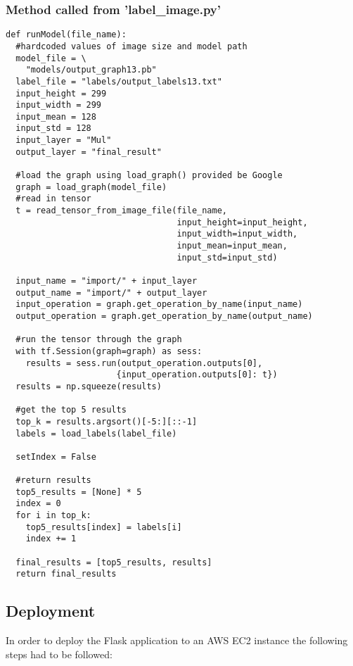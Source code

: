 \subsubsection*{Method called from 'label\_image.py'}
\begin{lstlisting}[style=Python]
def runModel(file_name):
  #hardcoded values of image size and model path
  model_file = \
    "models/output_graph13.pb"
  label_file = "labels/output_labels13.txt"
  input_height = 299
  input_width = 299
  input_mean = 128
  input_std = 128
  input_layer = "Mul"
  output_layer = "final_result"

  #load the graph using load_graph() provided be Google
  graph = load_graph(model_file)
  #read in tensor
  t = read_tensor_from_image_file(file_name,
                                  input_height=input_height,
                                  input_width=input_width,
                                  input_mean=input_mean,
                                  input_std=input_std)

  input_name = "import/" + input_layer
  output_name = "import/" + output_layer
  input_operation = graph.get_operation_by_name(input_name)
  output_operation = graph.get_operation_by_name(output_name)

  #run the tensor through the graph
  with tf.Session(graph=graph) as sess:
    results = sess.run(output_operation.outputs[0],
                      {input_operation.outputs[0]: t})
  results = np.squeeze(results)

  #get the top 5 results
  top_k = results.argsort()[-5:][::-1]
  labels = load_labels(label_file)

  setIndex = False

  #return results
  top5_results = [None] * 5
  index = 0
  for i in top_k:
    top5_results[index] = labels[i]
    index += 1

  final_results = [top5_results, results]
  return final_results
\end{lstlisting}

\subsection*{Deployment}
In order to deploy the Flask application to an AWS EC2 instance the following steps had to be followed:

